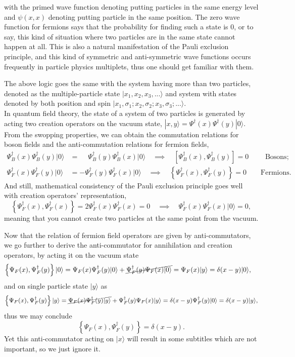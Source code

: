\documentclass{article}
\newcommand{\be}{\begin{equation}}
\newcommand{\ee}{\end{equation}}
\renewcommand{\1}{\left}
\renewcommand{\2}{\right}
\newcommand{\ra}{\rangle}
\newcommand{\sig}{\sigma}
\newcommand{\del}{\delta}
\begin{document}
with the primed wave function denoting putting particles in the same energy level and $\psi(x,x)$ denoting putting particle in the same position. The zero wave function for fermions says that the probability for finding such a state is $0$, or to say, this kind of situation where two particles are in the same state cannot happen at all. This is also a natural manifestation of the Pauli exclusion principle, and this kind of symmetric and anti-symmetric wave functions occurs frequently in particle physics multiplets, thus one should get familiar with them.

The above logic goes the same with the system having more than two particles, denoted as the multiple-particle state $|x_1,x_2,x_3,...\ra$ and system with states denoted by both position and spin $|x_1,\sig_1;x_2,\sig_2;x_3,\sig_3;...\ra$.\\

In quantum field theory, the state of a system of two particles is generated by acting two creation operators on the vacuum state, $|x,y\ra=\Psi^\dag(x)\Psi^\dag(y)|0\ra$. From the swopping properties, we can obtain the commutation relations for boson fields and the anti-commutation relations for fermion fields,
\be\begin{split}
\Psi_B^\dag(x)\Psi_B^\dag(y)|0\ra&=\phantom{-}\Psi_B^\dag(y)\Psi_B^\dag(x)|0\ra \quad\implies\quad \1[\Psi_B^\dag(x),\Psi_B^\dag(y)\2]=0 \quad\quad\text{\ Bosons};\\
\Psi_F^\dag(x)\Psi_F^\dag(y)|0\ra&=-\Psi_F^\dag(y)\Psi_F^\dag(x)|0\ra \quad\implies\quad \1\{\Psi_F^\dag(x),\Psi_F^\dag(y)\2\}=0\quad\quad\text{Fermions}.
\end{split}\ee
And still, mathematical consistency of the Pauli exclusion principle goes well with creation operators' representation,
\be
\1\{\Psi_F^\dag(x),\Psi_F^\dag(x)\2\}=2\Psi_F^\dag(x)\Psi_F^\dag(x)=0 \quad\implies\quad \Psi_F^\dag(x)\Psi_F^\dag(x)|0\ra=0,
\ee
meaning that you cannot create two particles at the same point from the vacuum.

Now that the relation of fermion field operators are given by anti-commutators, we go further to derive the anti-commutator for annihilation and creation operators, by acting it on the vacuum state
\be\begin{split}
\1\{\Psi_F(x),\Psi_F^\dag(y)\2\}|0\ra&=\Psi_F(x)\Psi_F^\dag(y)|0\ra+\cancel{\Psi_F^\dag(y)\Psi_F(x)|0\ra}=\Psi_F(x)|y\ra=\del(x-y)|0\ra,
\end{split}\ee
and on single particle state $|y\ra$ as
\be
\1\{\Psi_F(x),\Psi_F^\dag(y)\2\}|y\ra=\cancel{\Psi_F(x)\Psi_F^\dag(y)|y\ra}+\Psi_F^\dag(y)\Psi_F(x)|y\ra=\del(x-y)\Psi_F^\dag(y)|0\ra=\del(x-y)|y\ra,
\ee
thus we may conclude 
\be
\1\{\Psi_F(x),\Psi_F^\dag(y)\2\}=\del(x-y).
\ee
Yet this anti-commutator acting on $|x\ra$ will result in some subtitles which are not important, so we just ignore it.
\end{document}
